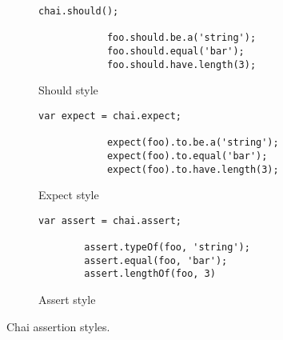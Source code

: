 
\newcommand{\assertionwidth}{0.328\textwidth}
\newcommand{\assertionsize}{\tiny}
\begin{figure}[H]
	\centering
	\begin{subfigure}[b]{\assertionwidth}
        \begin{lstlisting}[basicstyle=\assertionsize]
			chai.should();

			foo.should.be.a('string');
			foo.should.equal('bar');
			foo.should.have.length(3);
		\end{lstlisting}
        \caption{Should style}
        \label{fig:should_style}
    \end{subfigure}
    \begin{subfigure}[b]{\assertionwidth}
		\begin{lstlisting}[basicstyle=\assertionsize]
			var expect = chai.expect;
				
			expect(foo).to.be.a('string');
			expect(foo).to.equal('bar');
			expect(foo).to.have.length(3);
		\end{lstlisting}
        \caption{Expect style}
        \label{fig:expect_style}
    \end{subfigure}
    \begin{subfigure}[b]{\assertionwidth}
		\begin{lstlisting}[basicstyle=\assertionsize]
        var assert = chai.assert;

		assert.typeOf(foo, 'string');
		assert.equal(foo, 'bar');
		assert.lengthOf(foo, 3)
		\end{lstlisting}
        \caption{Assert style}
        \label{fig:assert_style}
    \end{subfigure}
	\caption[Chai assertions]{Chai assertion styles.}
	\label{fig:chai_assertions}
\end{figure}
